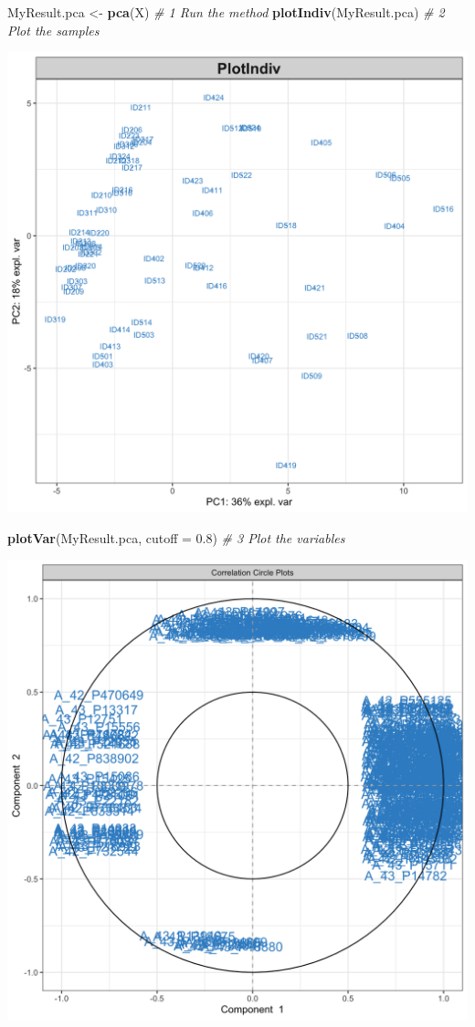 \documentclass[]{book}
\newenvironment{Shaded}{\begin{snugshade}}{\end{snugshade}}
\newcommand{\CommentTok}[1]{\textcolor[rgb]{0.56,0.35,0.01}{\textit{#1}}}
\newcommand{\DataTypeTok}[1]{\textcolor[rgb]{0.13,0.29,0.53}{#1}}
\newcommand{\FloatTok}[1]{\textcolor[rgb]{0.00,0.00,0.81}{#1}}
\newcommand{\KeywordTok}[1]{\textcolor[rgb]{0.13,0.29,0.53}{\textbf{#1}}}
\newcommand{\NormalTok}[1]{#1}
\newcommand{\StringTok}[1]{\textcolor[rgb]{0.31,0.60,0.02}{#1}}
\begin{document}
\begin{Shaded}
\begin{Highlighting}[]
\NormalTok{MyResult.pca <-}\StringTok{ }\KeywordTok{pca}\NormalTok{(X)     }\CommentTok{# 1 Run the method}
\KeywordTok{plotIndiv}\NormalTok{(MyResult.pca)    }\CommentTok{# 2 Plot the samples}
\end{Highlighting}
\end{Shaded}

\begin{center}\includegraphics[width=0.75\linewidth,]{Figures/03-pca-plots-1} \end{center}

\begin{Shaded}
\begin{Highlighting}[]
\KeywordTok{plotVar}\NormalTok{(MyResult.pca, }\DataTypeTok{cutoff =} \FloatTok{0.8}\NormalTok{)      }\CommentTok{# 3 Plot the variables}
\end{Highlighting}
\end{Shaded}

\begin{center}\includegraphics[width=0.75\linewidth,]{Figures/03-pca-plots-2} \end{center}
\end{document}
